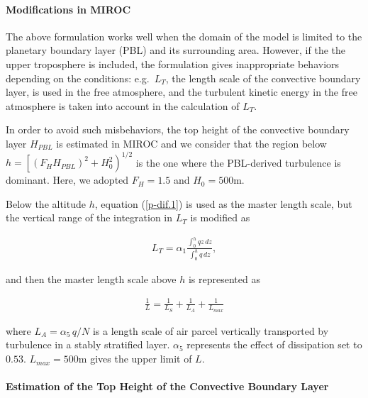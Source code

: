 \hypertarget{modifications-in-miroc}{%
\paragraph{Modifications in MIROC}\label{modifications-in-miroc}}

The above formulation works well when the domain of the model is limited to the planetary boundary layer (PBL) and its surrounding area. However, if the the upper troposphere is included, the
formulation gives inappropriate behaviors depending on the conditions: e.g.~\(L_T\), the length scale of the convective boundary layer, is used in the free atmosphere, and the turbulent kinetic energy
in the free atmosphere is taken into account in the calculation of \(L_T\).

In order to avoid such misbehaviors, the top height of the convective boundary layer \(H_{PBL}\) is estimated in MIROC and we consider that the region below
\(h=\left[(F_H H_{PBL})^2+H_0^2\right)^{1/2}\) is the one where the PBL-derived turbulence is dominant. Here, we adopted \(F_H=1.5\) and \(H_0=500\)m.

Below the altitude \(h\), equation (\ref{p-dif.1}) is used as the master length scale, but the vertical range of the integration in \(L_T\) is modified as

\begin{eqnarray}L_T=\alpha_1\frac{\displaystyle \int_0^h{qz}\,dz}{\displaystyle \int_0^h{q}\,dz},\end{eqnarray}

and then the master length scale above \(h\) is represented as

\begin{eqnarray}\frac{1}{L}=\frac{1}{L_S}+\frac{1}{L_A}+\frac{1}{L_{max}}\end{eqnarray}

where \(L_A=\alpha_5\,q/N\) is a length scale of air parcel vertically transported by turbulence in a stably stratified layer. \(\alpha_5\) represents the effect of dissipation set to \(0.53\).
\(L_{max}=500\)m gives the upper limit of \(L\).

\hypertarget{estimation-of-the-top-height-of-the-convective-boundary-layer}{%
\paragraph{Estimation of the Top Height of the Convective Boundary Layer}\label{estimation-of-the-top-height-of-the-convective-boundary-layer}}

